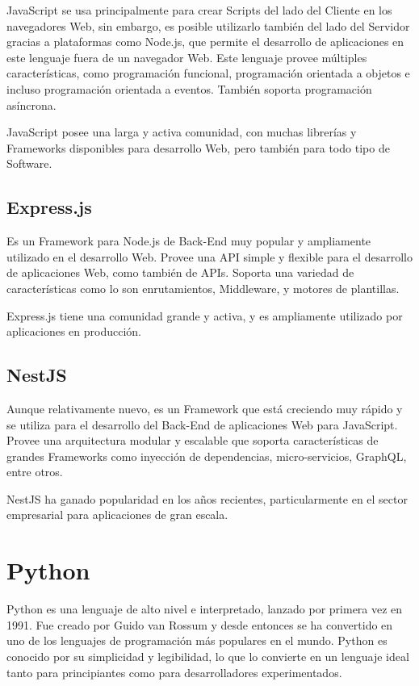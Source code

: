         JavaScript se usa principalmente para crear Scripts del lado del Cliente en los navegadores Web, sin embargo, es posible utilizarlo también del lado del Servidor gracias a plataformas como Node.js, que permite el desarrollo de aplicaciones en este lenguaje fuera de un navegador Web. Este lenguaje provee múltiples características, como programación funcional, programación orientada a objetos e incluso programación orientada a eventos. También soporta programación asíncrona.

        JavaScript posee una larga y activa comunidad, con muchas librerías y Frameworks disponibles para desarrollo Web, pero también para todo tipo de Software. \cite{flanagan2011javascript}

        
        \subsection{Express.js}
            Es un Framework para Node.js de Back-End muy popular y ampliamente utilizado en el desarrollo Web. Provee una API simple y flexible para el desarrollo de aplicaciones Web, como también de APIs. Soporta una variedad de características como lo son enrutamientos, Middleware, y motores de plantillas. 
    
            Express.js tiene una comunidad grande y activa, y es ampliamente utilizado por aplicaciones en producción. \cite{expressjs}
        \subsection{NestJS}
            Aunque relativamente nuevo, es un Framework que está creciendo muy rápido y se utiliza para el desarrollo del Back-End de aplicaciones Web para JavaScript. Provee una arquitectura modular y escalable que soporta características de grandes Frameworks como inyección de dependencias, micro-servicios, GraphQL, entre otros.
            
            NestJS ha ganado popularidad en los años recientes, particularmente en el sector empresarial para aplicaciones de gran escala. \cite{nestjs}
    \section{Python}
        Python es una lenguaje de alto nivel e interpretado, lanzado por primera vez en 1991. Fue creado por Guido van Rossum y desde entonces se ha convertido en uno de los lenguajes de programación más populares en el mundo. Python es conocido por su simplicidad y legibilidad, lo que lo convierte en un lenguaje ideal tanto para principiantes como para desarrolladores experimentados.

